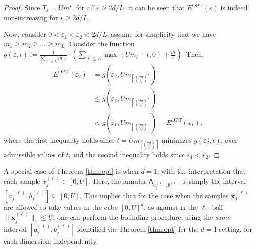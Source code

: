 \begin{proof}
	Since $T_\varepsilon = Um^\star$, for all $\varepsilon\geq 2d/L$, it can be seen that $E^\text{OPT}(\varepsilon)$ is indeed non-increasing for $\varepsilon\geq 2d/L$.
	
	Now, consider $0<\varepsilon_1<\varepsilon_2<2d/L$; assume for simplicity that we have $m_1\geq m_2\geq \ldots\geq m_L$. Consider the function $g(\varepsilon,t):= \frac{1}{\sum_{\ell'\leq L} m_{\ell'}}\cdot\left(\sum_{\ell\leq L} \max\left\{{Um_\ell-t},0\right\}+\frac{dt}{\varepsilon}\right).$ Then,
	\begin{align*}
		E^\text{OPT}(\varepsilon_2)&= g\left(\varepsilon_2,Um_{\left \lceil \left(\frac{2d}{\varepsilon_2}\right)\right \rceil}\right)\\
		&\leq g\left(\varepsilon_2,Um_{\left \lceil \left(\frac{2d}{\varepsilon_1}\right)\right \rceil}\right)\\
		&< g\left(\varepsilon_1,Um_{\left \lceil \left(\frac{2d}{\varepsilon_1}\right)\right \rceil}\right) = E^\text{OPT}(\varepsilon_1),
	\end{align*}
where the first inequality holds since $t = Um_{\left \lceil \left(\frac{2d}{\varepsilon_2}\right)\right \rceil}$ minimizes $g(\varepsilon_2,t)$, over admissible values of $t$, and the second inequality holds since $\varepsilon_1<\varepsilon_2$.
\end{proof}

A special case of Theorem \ref{thm:opt} is when $d=1$, with the interpretation that each sample $x_j^{(\ell)}\in [0,U]$. Here, the annulus $\mathsf{A}_{a_j^{(\ell)},b_j^{(\ell)}}$ is simply the interval $[a_j^{(\ell)}, b_j^{(\ell)}]\subseteq [0,U]$. This implies that for the case when the samples $\mathbf{x}_j^{(\ell)}$ are allowed to take values in the cube $[0,U]^d$, as against in the $\ell_1$-ball $\lVert \mathbf{x}_j^{(\ell)}\rVert_1\leq U$, one can perform the bounding procedure, using the \emph{same} interval $[a_j^{(\ell)}, b_j^{(\ell)}]$ identified via Theorem \ref{thm:opt} for the $d=1$ setting, for each dimension, independently.
	
